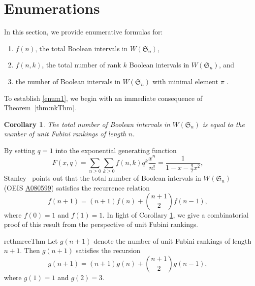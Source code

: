 \documentclass[11pt,reqno]{amsart}
\newcommand{\Sym}{\mathfrak{S}}
\newtheorem{corollary}[rethm]{Corollary}
\begin{document}
\section{Enumerations}
\label{sec: enumerations}

In this section, we provide enumerative formulas for:
\begin{enumerate}
    \item $f(n)$, the total Boolean intervals in $W(\Sym_n)$, \label{enum1}
    \item $f(n,k)$, the total number  of rank $k$ Boolean intervals in $W(\Sym_n)$,\label{enum2} and 
    \item the number of Boolean intervals in $W(\Sym_n)$ with minimal element $\pi$ \label{enum3}.
\end{enumerate}


To establish \eqref{enum1}, we begin with an immediate consequence of Theorem~\ref{thm:nkThm}.


\begin{corollary}\label{cor:ofmain}
    The total number of Boolean intervals in $W(\Sym_n)$ is equal to the number of unit Fubini rankings of length $n$.
\end{corollary}

By setting $q=1$ into the exponential generating function \cite[Exercise~3.185(h)]{stanley2012enumerative}
\begin{equation}
    F(x,q) 
    = \sum_{n\geq 0} \sum_{k\geq 0} f(n,k)q^k\frac{x^n}{n!} 
    = \frac{1}{1-x-\frac{q}{2}x^2}
    \label{eq:gen_fun},
\end{equation}
Stanley~\cite{stanley2016mathoverflow} points out that the total number of Boolean intervals in $W(\Sym_n)$ (OEIS \href{https://oeis.org/A080599}{A080599}) satisfies the recurrence relation  
\begin{equation}
    \label{eq: rec}
    f(n+1) = (n+1)f(n)+\binom{n+1}{2}f(n-1),
\end{equation}
where $f(0)=1$ and $f(1)=1$. 
In light of Corollary \ref{cor:ofmain}, we give a combinatorial proof of this result from the perspective of unit Fubini rankings.

\begin{restatable}{rethm}{recThm}
\label{thm: rec}
Let $g(n+1)$ denote the  number of unit Fubini rankings of length $n+1$. Then $g(n+1)$ satisfies the recursion
\[g(n+1)=(n+1)g(n)+\binom{n+1}{2}g(n-1),\]
where $g(1)=1$ and $g(2)=3$.
\end{restatable}
\end{document}
